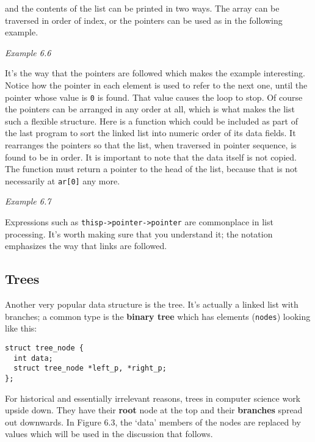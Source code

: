    and the contents of the list can be printed in two ways. The array can be
    traversed in order of index, or the pointers can be used as in the
    following example.


    \begin{center}\textit{Example 6.6}\end{center}


   It's the way that the pointers are followed which makes the example
    interesting. Notice how the pointer in each element is used to refer to the
    next one, until the pointer whose value is \texttt{0} is found. That
    value causes the \while{} loop to stop. Of course the pointers
    can be arranged in any order at all, which is what makes the list such
    a flexible structure. Here is a function which could be included as part of
    the last program to sort the linked list into numeric order of its data
    fields. It rearranges the pointers so that the list, when traversed in
    pointer sequence, is found to be in order. It is important to note that the
    data itself is not copied. The function must return a pointer to the head
    of the list, because that is not necessarily at \texttt{ar[0]} any
    more.


    \begin{center}\textit{Example 6.7}\end{center}


   Expressions such as \texttt{thisp->pointer->pointer} are
    commonplace in list processing. It's worth making sure that you understand
    it; the notation emphasizes the way that links are followed.


  

  \subsection{Trees}
   

   Another very popular data structure is the tree. It's actually a linked
    list with branches; a common type is the \textbf{binary tree} which has
    elements (\texttt{nodes}) looking like this:


   \begin{Verbatim}
struct tree_node {
  int data;
  struct tree_node *left_p, *right_p;
};
\end{Verbatim}

   For historical and essentially irrelevant reasons, trees in computer
    science work upside down. They have their \textbf{root} node at the top
    and their \textbf{branches} spread out downwards.
    In Figure 6.3, the `data' members of the nodes are replaced by values
    which will be used in the discussion that follows.


